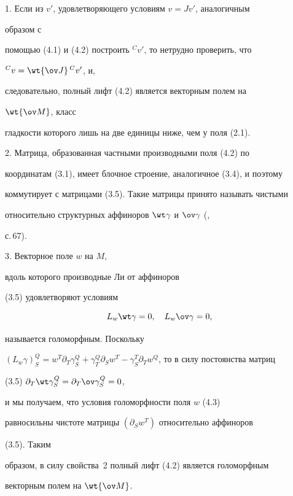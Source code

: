 1. Если из $v'$, удовлетворяющего условиям $v=J v'$, аналогичным


образом с


помощью (4.1) и (4.2) построить ${}^C v'$, то нетрудно проверить, что


${}^C v=\wt{\ov J}\,{}^C v'$, и,


следовательно, полный лифт (4.2) является векторным полем на


$\wt{\ov M}$, класс


гладкости которого лишь на две единицы ниже, чем у поля (2.1).





2. Матрица, образованная частными производными поля (4.2) по


координатам (3.1), имеет блочное строение, аналогичное (3.4), и поэтому


коммутирует с матрицами (3.5). Такие матрицы принято называть чистыми


относительно структурных аффиноров $\wt\gamma$ и $\ov\gamma$ (\cite{7},


с.\,67).





3. Векторное поле $w$ на $M$,


вдоль которого производные Ли от аффиноров


(3.5) удовлетворяют условиям


\begin{equation}


L_w\wt\gamma=0,\quad L_w\ov\gamma=0,


\end{equation}


называется голоморфным. Поскольку


$(L_w\gamma)^Q_S=w^T\partial_T\gamma^Q_S+\gamma^Q_T\partial_S


w^T-\gamma^T_S\partial_T w^Q$, то в силу постоянства матриц


(3.5) $\partial_T\wt\gamma^Q_S=\partial_T\ov\gamma^Q_S=0$,


и мы получаем, что условия голоморфности поля $w$ (4.3)


равносильны чистоте матрицы $(\partial_S w^T)$ относительно аффиноров


(3.5). Таким


образом, в силу свойства~2 полный лифт (4.2) является голоморфным


векторным полем на $\wt{\ov M}$.





